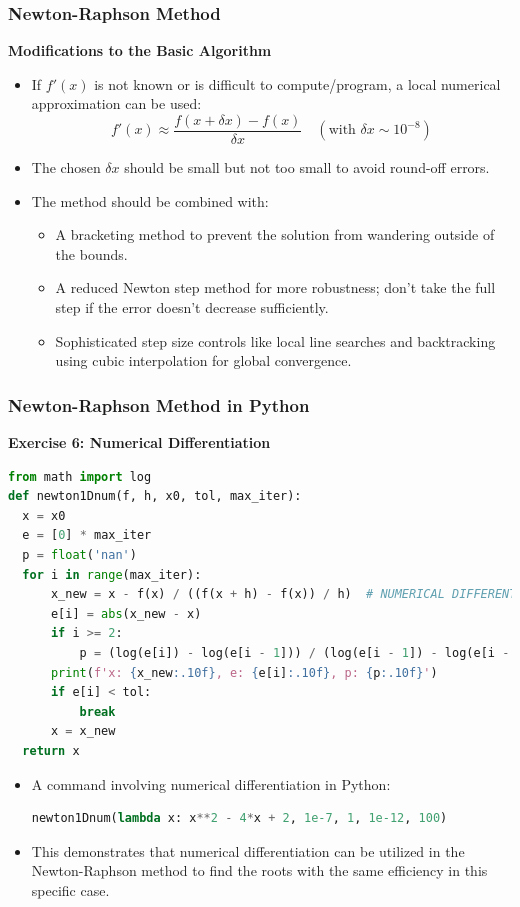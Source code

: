 \begin{frame}[fragile]
    \frametitle{Newton-Raphson Method}

    \textbf{Modifications to the Basic Algorithm}

    \begin{itemize}
        \item If \(f'(x)\) is not known or is difficult to compute/program, a local numerical approximation can be used:
        \[
        f'(x) \approx \frac{f(x+\delta x) - f(x)}{\delta x} \quad (\text{with } \delta x \sim 10^{-8})
        \]
        \item The chosen \(\delta x\) should be small but not too small to avoid round-off errors.
        
        \item The method should be combined with:
        \begin{itemize}
            \item A bracketing method to prevent the solution from wandering outside of the bounds.
            \item A reduced Newton step method for more robustness; don't take the full step if the error doesn't decrease sufficiently.
            \item Sophisticated step size controls like local line searches and backtracking using cubic interpolation for global convergence.
        \end{itemize}
    \end{itemize}
\end{frame}

\begin{frame}[fragile]
  \frametitle{Newton-Raphson Method in Python}
  
  \textbf{Exercise 6: Numerical Differentiation}
  \begin{lstlisting}[language=Python]
from math import log
def newton1Dnum(f, h, x0, tol, max_iter):
  x = x0
  e = [0] * max_iter
  p = float('nan')
  for i in range(max_iter):
      x_new = x - f(x) / ((f(x + h) - f(x)) / h)  # NUMERICAL DIFFERENTIATION
      e[i] = abs(x_new - x)
      if i >= 2:
          p = (log(e[i]) - log(e[i - 1])) / (log(e[i - 1]) - log(e[i - 2]))
      print(f'x: {x_new:.10f}, e: {e[i]:.10f}, p: {p:.10f}')
      if e[i] < tol:
          break
      x = x_new
  return x
  \end{lstlisting}
  \begin{itemize}
      \item A command involving numerical differentiation in Python:
      \begin{lstlisting}[language=Python]
newton1Dnum(lambda x: x**2 - 4*x + 2, 1e-7, 1, 1e-12, 100)
      \end{lstlisting}
      \item This demonstrates that numerical differentiation can be utilized in the Newton-Raphson method to find the roots with the same efficiency in this specific case.
  \end{itemize}
\end{frame}

